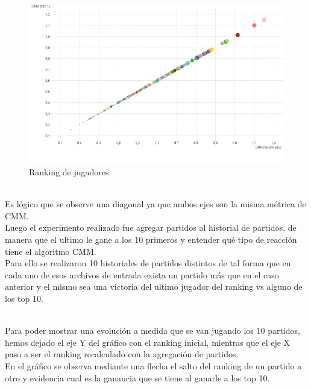 \begin{figure}[H]
\centering
\includegraphics[width=1\textwidth]{IMG/comparativa cmm -cmm foto 0.png}
\caption{Ranking de jugadores}
\label{fig:Ranking de jugadores}
\end{figure}

\\
Es lógico que se observe una diagonal ya que ambos ejes son la misma métrica de CMM.
\\
Luego el experimento realizado fue agregar partidos al historial de partidos, de manera que el ultimo le gane a los 10 primeros y entender qué tipo de reacción tiene el algoritmo CMM.
\\
Para ello se realizaron 10 historiales de partidos distintos de tal forma que en cada uno de esos archivos de entrada exista un partido más que en el caso anterior y
el mismo sea una victoria del ultimo jugador del ranking vs alguno de los top 10.

\\
Para poder mostrar una evolución a medida que se van jugando los 10 partidos, hemos dejado el eje Y del gráfico con el ranking inicial, mientras que el eje X paso a ser el ranking recalculado con la agregación de partidos.\\
En el gráfico se observa mediante una flecha el salto del ranking de un partido a otro y evidencia cual es la ganancia que se tiene al ganarle a los top 10. 
\\

